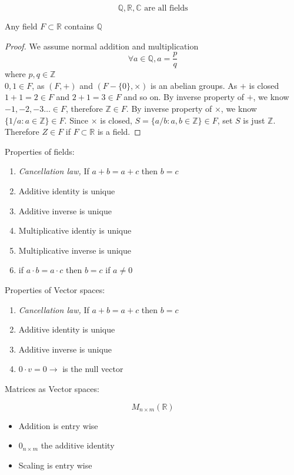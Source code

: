 \documentclass[11pt,a4paper]{colorart}
\def\l{\left}
\def\r{\right}
\def\R{\mathbb{R}}
\def\C{\mathbb{C}}
\def\Z{\mathbb{Z}}
\def\Q{\mathbb{Q}}
\begin{document}
\begin{example}
	\[ \Q, \R, \C \text{ are all fields}\]
\end{example}

\begin{proposition}
	Any field $ F\subset \R$ contains $\Q$
\end{proposition}

\begin{proof}
	We assume normal addition and multiplication
	\[ \forall a \in \Q, a = \frac{p}{q} \]
	where $p,q \in \Z$\\
	$0,1 \in F$, as $\l(F, +\r)$ and $\l(F-\{0\}, \times\r)$ is an abelian groups. 
	As $+$ is closed $1+1 = 2 \in F$ and $2+1=3 \in F$ and so on. 
	By inverse property of $+$, we know $-1,-2,-3 \dots\in F$, therefore $\Z\in F$. 
	By inverse property of $\times$, we know $\{1/a: a\in\Z\}\in F$.
	Since $\times$ is closed, $S=\{a/b: a,b \in\Z\}\in F$, set $S$ is just $\Z$. Therefore $Z\in F$ if $F \subset\R$ is a field.
	
\end{proof}

Properties of fields:

\begin{enumerate}
	\item \textit{Cancellation law,}
		If $a+b = a+c$ then $b=c$
	\item Additive identity is unique
	\item Additive inverse is unique
	\item Multiplicative identiy is unique
	\item Multiplicative inverse is unique
	\item 
		if $a\cdot b = a \cdot c$ then $b=c$ if $a \neq 0$
\end{enumerate}

Properties of Vector spaces:

\begin{enumerate}
	\item \textit{Cancellation law,}
		If $a+b = a+c$ then $b=c$
	\item Additive identity is unique
	\item Additive inverse is unique
	\item $0\cdot v = 0\rightarrow$ is the null vector
\end{enumerate}

Matrices as Vector spaces:

\[ M_{n\times m}\l(\R\r) \]

\begin{itemize}
	\item Addition is entry wise
	\item $0_{n\times m}$ the additive identity
	\item Scaling is entry wise
\end{itemize}
\end{document}
